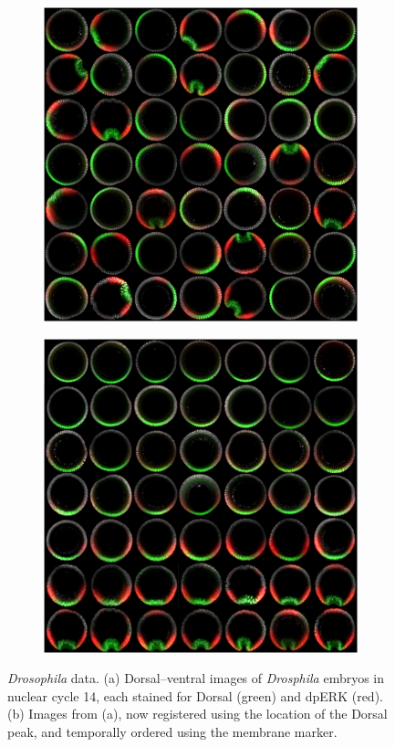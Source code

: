 \documentclass{pnastwo}
\begin{document}
\begin{figure}
\begin{subfigure}{0.25\textwidth}
\includegraphics[width=\textwidth]{fig2a}
\caption{}
\label{subfig:images_scrambled}
\end{subfigure}
\begin{subfigure}{0.25\textwidth}
\includegraphics[width=\textwidth]{fig2b}
\caption{}
\end{subfigure}
\caption{{\em Drosophila} data. (a) Dorsal--ventral images of {\em Drosphila} embryos in nuclear cycle 14, each stained for Dorsal (green) and dpERK (red). (b) Images from (a), now registered using the location of the Dorsal peak, and temporally ordered using the membrane marker.} 
\label{fig:fluorescent_images}
\end{figure}
\end{document}

